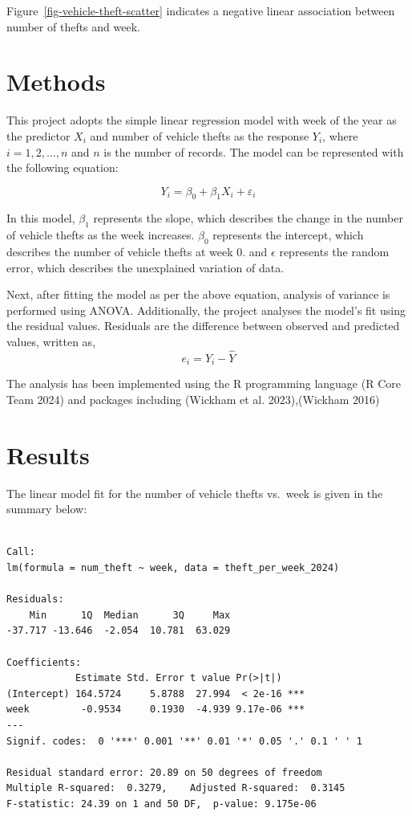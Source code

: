 \documentclass[
  letterpaper,
  DIV=11,
  numbers=noendperiod]{scrartcl}
\begin{document}
Figure~\ref{fig-vehicle-theft-scatter} indicates a negative linear
association between number of thefts and week.

\section{Methods}\label{sec-methods}

This project adopts the simple linear regression model with week of the
year as the predictor \(X_i\) and number of vehicle thefts as the
response \(Y_i\), where \(i = 1, 2, ..., n\) and \(n\) is the number of
records. The model can be represented with the following equation:

\[Y_i = \beta_0 +\beta_1 X_i + \varepsilon_i\]

In this model, \(\beta_1\) represents the slope, which describes the
change in the number of vehicle thefts as the week increases.
\(\beta_0\) represents the intercept, which describes the number of
vehicle thefts at week 0. and \(\epsilon\) represents the random error,
which describes the unexplained variation of data.

Next, after fitting the model as per the above equation, analysis of
variance is performed using ANOVA. Additionally, the project analyses
the model's fit using the residual values. Residuals are the difference
between observed and predicted values, written as,
\[e_i = Y_i - \hat{Y}\]

The analysis has been implemented using the R programming language (R
Core Team 2024) and packages including (Wickham et al. 2023),(Wickham
2016)

\section{Results}\label{sec-results}

The linear model fit for the number of vehicle thefts vs.~week is given
in the summary below:

\begin{verbatim}

Call:
lm(formula = num_theft ~ week, data = theft_per_week_2024)

Residuals:
    Min      1Q  Median      3Q     Max 
-37.717 -13.646  -2.054  10.781  63.029 

Coefficients:
            Estimate Std. Error t value Pr(>|t|)    
(Intercept) 164.5724     5.8788  27.994  < 2e-16 ***
week         -0.9534     0.1930  -4.939 9.17e-06 ***
---
Signif. codes:  0 '***' 0.001 '**' 0.01 '*' 0.05 '.' 0.1 ' ' 1

Residual standard error: 20.89 on 50 degrees of freedom
Multiple R-squared:  0.3279,    Adjusted R-squared:  0.3145 
F-statistic: 24.39 on 1 and 50 DF,  p-value: 9.175e-06
\end{verbatim}
\end{document}

